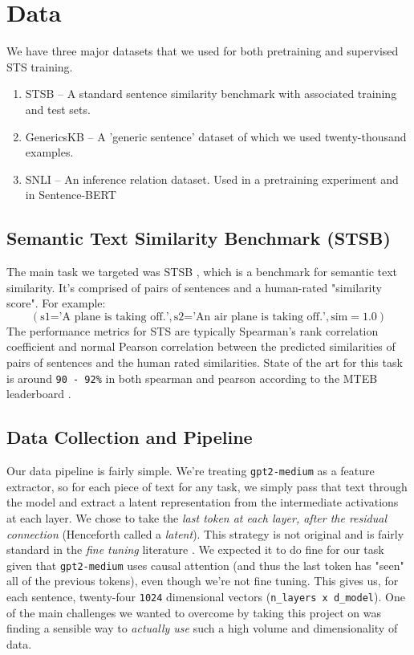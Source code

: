 \documentclass{article}
\begin{document}
\section{Data}
We have three major datasets that we used for both pretraining and supervised STS training.
\begin{enumerate}
    \item STSB \cite{STS} -- A standard sentence similarity benchmark with associated training and test sets.
    \item GenericsKB \cite{bhakthavatsalam2020genericskbknowledgebasegeneric} -- A 'generic sentence' dataset of which we used twenty-thousand examples.
    \item SNLI \cite{snli} -- An inference relation dataset. Used in a pretraining experiment and in Sentence-BERT \cite{reimers2019sentencebertsentenceembeddingsusing}
\end{enumerate}

\subsection{Semantic Text Similarity Benchmark (STSB)} \label{STS-section}
The main task we targeted was STSB \cite{STS}, which is a benchmark for semantic text similarity. It's comprised of pairs of sentences and a human-rated "similarity score". For example:
$$
(\text{s1='A plane is taking off.'}, \text{s2='An air plane is taking off.'}, \text{sim}=1.0)
$$
The performance metrics for STS are typically Spearman's rank correlation coefficient and normal Pearson correlation between the predicted similarities of pairs of sentences and the human rated similarities. State of the art for this task is around \verb|90 - 92%| in both spearman and pearson according to the MTEB leaderboard \cite{muennighoff2022mteb}.

\subsection{Data Collection and Pipeline} \label{latent}
Our data pipeline is fairly simple. We're treating \verb|gpt2-medium| as a feature extractor, so for each piece of text for any task, we simply pass that text through the model and extract a latent representation from the intermediate activations at each layer. We chose to take the \textit{last token at each layer, after the residual connection} (Henceforth called a \textit{latent}). This strategy is not original and is fairly standard in the \textit{fine tuning} literature \cite{LLMEmbed}. We expected it to do fine for our task given that \verb|gpt2-medium| uses causal attention (and thus the last token has "seen" all of the previous tokens), even though we're not fine tuning. This gives us, for each sentence, twenty-four \verb|1024| dimensional vectors (\verb|n_layers x d_model|). One of the main challenges we wanted to overcome by taking this project on was finding a sensible way to \textit{actually use} such a high volume and dimensionality of data.
\end{document}
